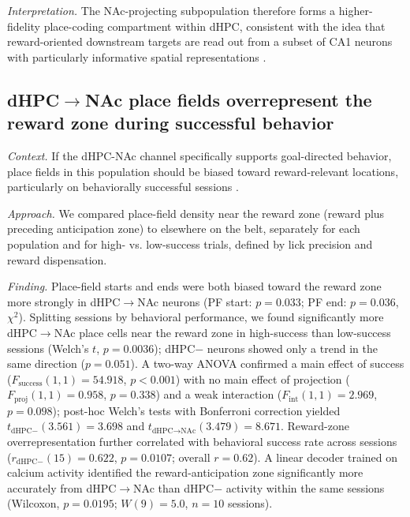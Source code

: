 \documentclass[11pt]{article}
\begin{document}
\textit{Interpretation.} The NAc-projecting subpopulation therefore forms a higher-fidelity place-coding compartment within dHPC, consistent with the idea that reward-oriented downstream targets are read out from a subset of CA1 neurons with particularly informative spatial representations \citep{Xiao2020Conjunctive,Ciocchi2015Selective}.

\subsection{dHPC$\rightarrow$NAc place fields overrepresent the reward zone during successful behavior}

\textit{Context.} If the dHPC-NAc channel specifically supports goal-directed behavior, place fields in this population should be biased toward reward-relevant locations, particularly on behaviorally successful sessions \citep{Hok2007Goal,Gauthier2018Reward,Sosa2018Reward,Sato2020Overrepresentation}.

\textit{Approach.} We compared place-field density near the reward zone (reward plus preceding anticipation zone) to elsewhere on the belt, separately for each population and for high- vs. low-success trials, defined by lick precision and reward dispensation.

\textit{Finding.} Place-field starts and ends were both biased toward the reward zone more strongly in dHPC$\rightarrow$NAc neurons (PF start: $p=0.033$; PF end: $p=0.036$, $\chi^2$). Splitting sessions by behavioral performance, we found significantly more dHPC$\rightarrow$NAc place cells near the reward zone in high-success than low-success sessions (Welch's $t$, $p=0.0036$); dHPC$-$ neurons showed only a trend in the same direction ($p=0.051$). A two-way ANOVA confirmed a main effect of success ($F_{\text{success}}(1,1)=54.918$, $p<0.001$) with no main effect of projection ($F_{\text{proj}}(1,1)=0.958$, $p=0.338$) and a weak interaction ($F_{\text{int}}(1,1)=2.969$, $p=0.098$); post-hoc Welch's tests with Bonferroni correction yielded $t_{\text{dHPC}-}(3.561)=3.698$ and $t_{\text{dHPC}\rightarrow\text{NAc}}(3.479)=8.671$. Reward-zone overrepresentation further correlated with behavioral success rate across sessions ($r_{\text{dHPC}-}(15)=0.622$, $p=0.0107$; overall $r=0.62$). A linear decoder trained on calcium activity identified the reward-anticipation zone significantly more accurately from dHPC$\rightarrow$NAc than dHPC$-$ activity within the same sessions (Wilcoxon, $p=0.0195$; $W(9)=5.0$, $n=10$ sessions).
\end{document}
